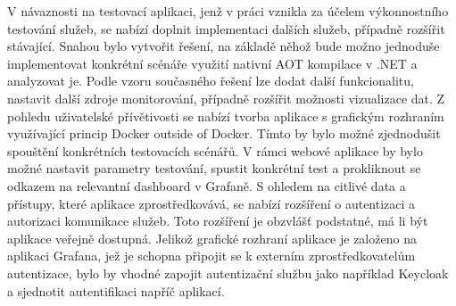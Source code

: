V návaznosti na testovací aplikaci, jenž v práci vznikla za účelem výkonnostního testování služeb, se nabízí doplnit implementaci dalších služeb, případně rozšířit stávající. Snahou bylo vytvořit řešení, na základě něhož bude možno jednoduše implementovat konkrétní scénáře využití nativní AOT kompilace v .NET a analyzovat je. Podle vzoru současného řešení lze dodat další funkcionalitu, nastavit další zdroje monitorování, případně rozšířit možnosti vizualizace dat. Z pohledu uživatelské přívětivosti se nabízí tvorba aplikace s grafickým rozhraním využívající princip Docker outside of Docker. Tímto by bylo možné zjednodušit spouštění konkrétních testovacích scénářů. V rámci webové aplikace by bylo možné nastavit parametry testování, spustit konkrétní test a prokliknout se odkazem na relevantní dashboard v Grafaně. S ohledem na citlivé data a přístupy, které aplikace zprostředkovává, se nabízí rozšíření o autentizaci a autorizaci komunikace služeb. Toto rozšíření je obzvlášť podstatné, má li být aplikace veřejně dostupná. Jelikož grafické rozhraní aplikace je založeno na aplikaci Grafana, jež je schopna připojit se k externím zprostředkovatelům autentizace, bylo by vhodné zapojit autentizační službu jako například Keycloak a sjednotit autentifikaci napříč aplikací.
